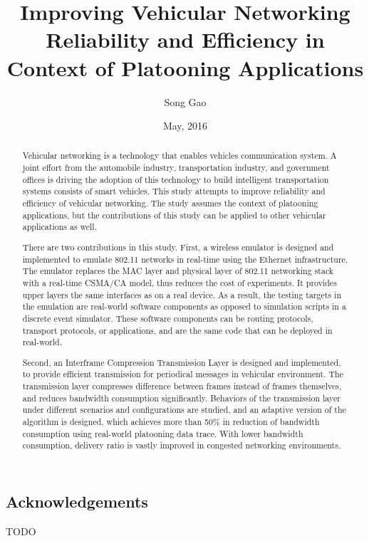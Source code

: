 \documentclass[12pt]{report}
\title{Improving Vehicular Networking Reliability and Efficiency in Context of Platooning Applications}
\author{Song Gao}
\date{May, 2016} %
\begin{document}
\begin{romanpages}      %

\TitlePage

\chapter*{Acknowledgements}
%

TODO

\begin{abstract} 
  Vehicular networking is a technology that enables vehicles communication system. A joint effort from the automobile industry, transportation industry, and government offices is driving the adoption of this technology to build intelligent transportation systems consists of smart vehicles. This study attempts to improve reliability and efficiency of vehicular networking. The study assumes the context of platooning applications, but the contributions of this study can be applied to other vehicular applications as well.

  There are two contributions in this study. First, a wireless emulator is designed and implemented to emulate 802.11 networks in real-time using the Ethernet infrastructure. The emulator replaces the MAC layer and physical layer of 802.11 networking stack with a real-time CSMA/CA model, thus reduces the cost of experiments. It provides upper layers the same interfaces as on a real device. As a result, the testing targets in the emulation are real-world software components as opposed to simulation scripts in a discrete event simulator. These software components can be routing protocols, transport protocols, or applications, and are the same code that can be deployed in real-world.

  Second, an Interframe Compression Transmission Layer is designed and implemented, to provide efficient transmission for periodical messages in vehicular environment. The transmission layer compresses difference between frames instead of frames themselves, and reduces bandwidth consumption significantly. Behaviors of the transmission layer under different scenarios and configurations are studied, and an adaptive version of the algorithm is designed, which achieves more than 50\% in reduction of bandwidth consumption using real-world platooning data trace. With lower bandwidth consumption, delivery ratio is vastly improved in congested networking environments.
\end{abstract}

\tableofcontents
\listoffigures
\listoftables

\printnomenclature[1.0in] %
\end{romanpages}        %
\end{document}

